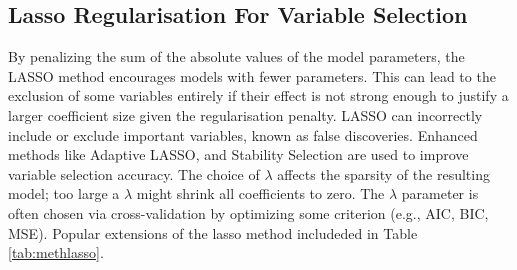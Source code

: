 

\subsection{Lasso Regularisation For Variable Selection }
\noindent By penalizing the sum of the absolute values of the model parameters, the LASSO method encourages models with fewer parameters. This can lead to the exclusion of some variables entirely if their effect is not strong enough to justify a larger coefficient size given the regularisation penalty. LASSO can incorrectly include or exclude important variables, known as false discoveries. Enhanced methods like Adaptive LASSO, and Stability Selection are used to improve variable selection accuracy. The choice of \(\lambda\) affects the sparsity of the resulting model; too large a \(\lambda\) might shrink all coefficients to zero. The \(\lambda\) parameter is often chosen via cross-validation by optimizing some criterion (e.g., AIC, BIC, MSE). \parencite{freijeirogonzalez_critical_2022} Popular extensions of the lasso method includeded in Table \ref{tab:methlasso}.


